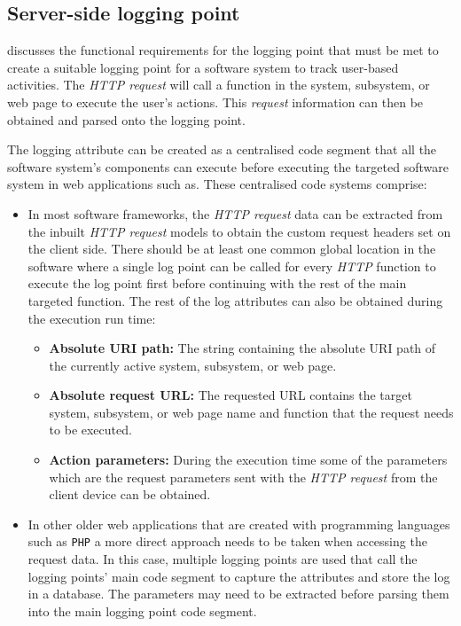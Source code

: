 \clearpage

\subsection{Server-side logging point}\label{sec:ch2_serverSideLoggingpoint}
 discusses the functional requirements for the logging point that must be met to create a suitable logging point for a software system to track user-based activities. The \textit{HTTP request} will call a function in the system, subsystem, or web page to execute the user's actions. This \textit{request} information can then be obtained and parsed onto the logging point. \par The logging attribute can be created as a centralised code segment that all the software system's components can execute before executing the targeted software system in web applications such as. These centralised code systems comprise:

\begin{itemize}
	\item In most software frameworks, the \textit{HTTP request} data can be extracted from the inbuilt \textit{HTTP request} models to obtain the custom request headers set on the client side. There should be at least one common global location in the software where a single log point can be called for every \textit{HTTP} function to execute the log point first before continuing with the rest of the main targeted function. The rest of the log attributes can also be obtained during the execution run time:
	\begin{itemize}
		\item \textbf{Absolute URI path:} The string containing the absolute URI path of the currently active system, subsystem, or web page. 
		\item \textbf{Absolute request URL:} The requested URL contains the target system, subsystem, or web page name and function that the request needs to be executed. 
		\item \textbf{Action parameters:} During the execution time some of the parameters which are the request parameters sent with the \textit{HTTP request} from the client device can be obtained.
	\end{itemize}
	\item In other older web applications that are created with programming languages such as \texttt{PHP} a more direct approach needs to be taken when accessing the request data. In this case, multiple logging points are used that call the logging points' main code segment to capture the attributes and store the log in a database. The parameters may need to be extracted before parsing them into the main logging point code segment.
\end{itemize}

